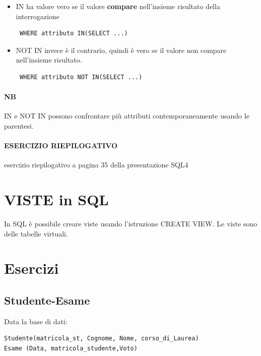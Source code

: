 \documentclass[12pt, a4paper, openany]{book}
\begin{document}
\begin{itemize}
    \item IN ha valore vero se il valore \textbf{compare} nell'insieme risultato della interrogazione
    \begin{verbatim} WHERE attributo IN(SELECT ...) \end{verbatim}
    \item NOT IN invece è il contrario, quindi è vero se il valore non compare nell'insieme risultato.
    \begin{verbatim} WHERE attributo NOT IN(SELECT ...) \end{verbatim}
\end{itemize}

\paragraph{NB} IN e NOT IN possono confrontare più attributi contemporaneamente usando le parentesi.

\paragraph{ESERCIZIO RIEPILOGATIVO} esercizio riepilogativo a pagina 35 della presentazione SQL4

\section{VISTE in SQL}
In SQL è possibile creare viste usando l'istruzione CREATE VIEW. Le viste sono delle tabelle virtuali.

\section{Esercizi}



\subsection*{Studente-Esame}
Data la base di dati:
\begin{verbatim}
Studente(matricola_st, Cognome, Nome, corso_di_Laurea)
Esame (Data, matricola_studente,Voto)
\end{verbatim}
\end{document}
